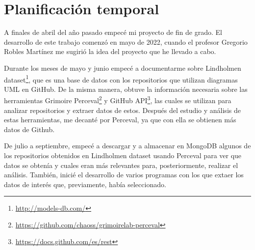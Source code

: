 \documentclass[a4paper, 12pt]{book}
\begin{document}
\section{Planificación temporal}
\label{sec:planificacion-temporal}




A finales de abril del año pasado empecé mi proyecto de fin de grado. 
El desarrollo de este trabajo comenzó en mayo de 2022, cuando el profesor Gregorio Robles Martínez me sugirió la idea del proyecto que he llevado a cabo. 


Durante los meses de mayo y junio empecé a documentarme sobre Lindholmen dataset\footnote{\url{http://models-db.com/}}, que es una base de datos con los repositorios que utilizan diagramas UML en GitHub.
De la misma manera, obtuve la información necesaria sobre las herramientas Grimoire Perceval\footnote{\url{https://github.com/chaoss/grimoirelab-perceval}} y GitHub API\footnote{\url{https://docs.github.com/es/rest}}, las cuales se utilizan para analizar repositorios y extraer datos de estos. 
Después del estudio y análisis de estas herramientas, me decanté por Perceval, ya que con ella se obtienen más datos de Github.


De julio a septiembre, empecé a descargar y a almacenar en MongoDB algunos de los repositorios obtenidos en Lindholmen dataset usando Perceval para ver que datos se obtenía y cuales eran más relevantes para, posteriormente, realizar el análisis.
También, inicié el desarrollo de varios programas con los que extaer los datos de interés que, previamente, había seleccionado.
\end{document}
